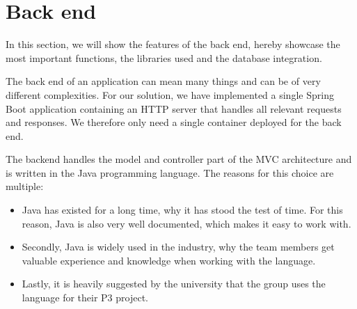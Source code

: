 \section{Back end}\label{sec:back-end}

In this section, we will show the features of the back end, hereby showcase the most important functions,
the libraries used and the database integration.

The back end of an application can mean many things and can be of very different complexities.
For our solution, we have implemented a single Spring Boot application containing an HTTP server that handles all
relevant requests and responses.
We therefore only need a single container deployed for the back end.

The backend handles the model and controller part of the MVC architecture and is written in the Java programming
language.
The reasons for this choice are multiple:

\begin{itemize}
    \item Java has existed for a long time, why it has stood the test of time.
    For this reason, Java is also very well documented, which makes it easy to work with.

    \item Secondly, Java is widely used in the industry, why the team members get valuable experience and knowledge when
    working with the language.

    \item Lastly, it is heavily suggested by the university that the group uses the language for their P3 project.
\end{itemize}





